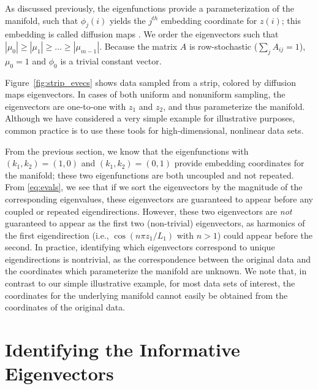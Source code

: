 \documentclass[preprint]{elsarticle}
\begin{document}
As discussed previously, the eigenfunctions provide a parameterization of the manifold, such that $\phi_{j}(i)$ yields the $j^{th}$ embedding coordinate for $z(i)$; this embedding is called diffusion maps \cite{...}.
%
We order the eigenvectors such that $|\mu_0| \ge |\mu_1| \ge \dots \ge |\mu_{m-1}|$.%
%
Because the matrix $A$ is row-stochastic ($\sum_j A_{ij} = 1$),  $\mu_0 = 1$ and $\phi_0$ is a trivial constant vector.

Figure~\ref{fig:strip_evecs} shows data sampled from a strip, colored by diffusion maps eigenvectors. 
%
In cases of both uniform and nonuniform sampling, the eigenvectors are one-to-one with $z_1$ and $z_2$, and thus parameterize the manifold. 
%
Although we have considered a very simple example for illustrative purposes, common practice is to use these tools for high-dimensional, nonlinear data sets.

From the previous section, we know that the eigenfunctions with $(k_1, k_2) =(1, 0)$ and $(k_1, k_2) =(0, 1)$ provide embedding coordinates for the manifold; these two eigenfunctions are both uncoupled and not repeated.  
%
From \eqref{eq:evals}, we see that if we sort the eigenvectors by the magnitude of the corresponding eigenvalues, these eigenvectors are guaranteed to appear before any coupled or repeated eigendirections. 
%
However, these two eigenvectors are {\em not} guaranteed to appear as the first two (non-trivial) eigenvectors, as harmonics of the first eigendirection (i.e., $\cos \left( n \pi z_1 / L_1 \right)$ with $n > 1$) could appear before the second.
%
In practice, identifying which eigenvectors correspond to unique eigendirections is nontrivial, as the correspondence between the original data and the coordinates which parameterize the manifold are unknown.
%
We note that, in contrast to our simple illustrative example, for most data sets of interest, the coordinates for the underlying manifold cannot easily be obtained from the coordinates of the original data. 

\section{Identifying the Informative Eigenvectors }
\end{document}
